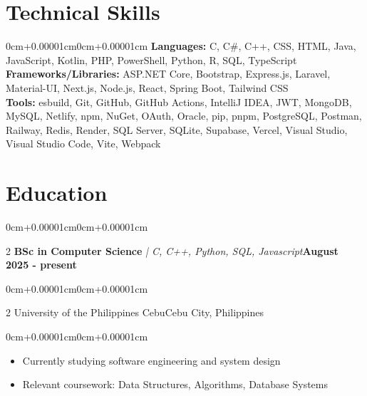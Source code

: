 \documentclass[10pt, letterpaper]{article}
\newenvironment{highlights}{\begin{itemize}[topsep=0.10cm,parsep=0.10cm,partopsep=0pt,itemsep=0pt,leftmargin=0cm+10pt]}{\end{itemize}}
\newenvironment{onecolentry}{\begin{adjustwidth}{0cm+0.00001cm}{0cm+0.00001cm}}{\end{adjustwidth}}
\newenvironment{twocolentry}[2][]{\onecolentry\def\secondColumn{#2}\setcolumnwidth{\fill,5cm}\begin{paracol}{2}}{\switchcolumn \raggedleft \secondColumn\end{paracol}\endonecolentry}
\begin{document}
\section{Technical Skills}
\begin{onecolentry}
    \textbf{Languages:} C, C\#, C++, CSS, HTML, Java, JavaScript, Kotlin, PHP, PowerShell, Python, R, SQL, TypeScript \\
    \vspace{0.05cm}
    \textbf{Frameworks/Libraries:} ASP.NET Core, Bootstrap, Express.js, Laravel, Material-UI, Next.js, Node.js, React, Spring Boot, Tailwind CSS \\
    \vspace{0.05cm}
    \textbf{Tools:} esbuild, Git, GitHub, GitHub Actions, IntelliJ IDEA, JWT, MongoDB, MySQL, Netlify, npm, NuGet, OAuth, Oracle, pip, pnpm, PostgreSQL, Postman, Railway, Redis, Render, SQL Server, SQLite, Supabase, Vercel, Visual Studio, Visual Studio Code, Vite, Webpack \\
    \vspace{0.05cm}

\end{onecolentry}

\section{Education}

    \begin{twocolentry}{\textbf{August 2025 - present}}
    \textbf{BSc in Computer Science}\textit{ | C, C++, Python, SQL, Javascript}\end{twocolentry}
    \vspace{0.05cm}
    \begin{twocolentry}{Cebu City, Philippines}
    University of the Philippines Cebu\end{twocolentry}
    \vspace{0.10cm}
    \begin{onecolentry}
        \begin{highlights}
            \item Currently studying software engineering and system design
            \item Relevant coursework: Data Structures, Algorithms, Database Systems
        \end{highlights}
    \end{onecolentry}
    \vspace{0.15cm}
\end{document}
